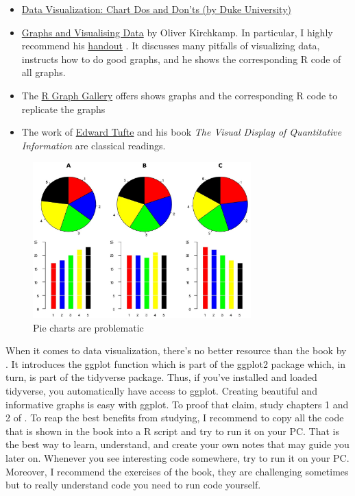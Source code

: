 \documentclass[
  12pt,
  oneside]{book}
\providecommand{\tightlist}{%
  \setlength{\itemsep}{0pt}\setlength{\parskip}{0pt}}
\theoremstyle{definition}
\theoremstyle{definition}
\theoremstyle{definition}
\theoremstyle{definition}
\theoremstyle{remark}
\begin{document}
\begin{itemize}
  \begin{itemize}
  \tightlist
  \item
    \href{https://guides.library.duke.edu/datavis/topten}{Data Visualization: Chart Dos and Don'ts (by Duke University)}
  \item
    \href{https://www.kirchkamp.de/graph/}{Graphs and Visualising Data} by Oliver Kirchkamp. In particular, I highly recommend his \href{https://www.kirchkamp.de/oekonometrie/pdf/gra-p.pdf}{handout} \citep{Kirchkamp2018Using}. It discusses many pitfalls of visualizing data, instructs how to do good graphs, and he shows the corresponding R code of all graphs.\\
  \item
    The \href{https://www.r-graph-gallery.com}{R Graph Gallery} offers shows graphs and the corresponding R code to replicate the graphs
  \item
    The work of \href{www.edwardtufte.com}{Edward Tufte} and his book \emph{The Visual Display of Quantitative Information} \citep{Tufte2022Visual} are classical readings.
  \end{itemize}
\end{itemize}

\begin{figure}
\centering
\includegraphics[width=0.75\textwidth,height=\textheight]{fig/piebad.jpeg}
\caption[\label{fig:piebad} Pie charts are problematic]{\label{fig:piebad} Pie charts are problematic\footnotemark{}}
\end{figure}

When it comes to data visualization, there's no better resource than the book by \citet{Wickham2023R}. It introduces the ggplot function which is part of the ggplot2 package which, in turn, is part of the tidyverse package. Thus, if you've installed and loaded tidyverse, you automatically have access to ggplot. Creating beautiful and informative graphs is easy with ggplot. To proof that claim, study chapters 1 and 2 of \citet{Wickham2023R}. To reap the best benefits from studying, I recommend to copy all the code that is shown in the book into a R script and try to run it on your PC. That is the best way to learn, understand, and create your own notes that may guide you later on. Whenever you see interesting code somewhere, try to run it on your PC. Moreover, I recommend the exercises of the book, they are challenging sometimes but to really understand code you need to run code yourself.
\end{document}
